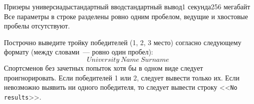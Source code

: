 \begin{problem}{Призеры универсиады}{стандартный ввод}{стандартный вывод}{1 секунда}{256 мегабайт}
Все параметры в строке разделены ровно одним пробелом, ведущие и хвостовые пробелы отсутствуют.

\OutputFile
Построчно выведите тройку победителей (1, 2, 3 место) согласно следующему формату (между словами~--- ровно один пробел):
$$University\ Name\ Surname$$
Спортсменов без зачетных попыток хотя бы в одном виде следует проигнорировать.  Если победителей 1 или 2, следует вывести только их. Если невозможно выявить ни одного победителя, то следует вывести строку <<\texttt{No results}>>.

\Examples

\thelinewidth
{}\thelinewidth
\small
\begin{example}
%
\end{example}
\begin{example}
%
%
\end{example}
\normalsize

\end{problem}

